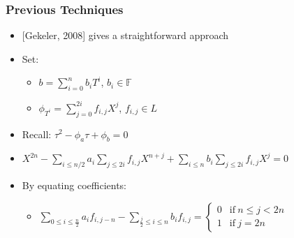 \documentclass{beamer}
\begin{document}
\begin{frame}
\frametitle{Previous Techniques}

\begin{itemize}
    \item $[$Gekeler, 2008] gives a straightforward approach
    \item Set:
    \begin{itemize}
        \item $b = \sum_{i=0}^n b_i T^i$, $b_i \in \mathbb{F}$
        \item $\phi_{T^i} = \sum_{j=0}^{2i}f_{i,j} X^j$, $f_{i,j} \in L$
    \end{itemize}
    \item Recall: $\tau^2 - \phi_a\tau + \phi_b = 0$
    \item $X^{2n} - \sum_{i \leq n/2}a_i\sum_{j\leq 2i}f_{i,j} X^{n + j} + \sum_{i\leq n}b_i \sum_{j \leq 2i}f_{i,j} X^j = 0 $
        \item By equating coefficients:
    \begin{itemize}
    \item 
    $\sum_{0 \leq i \leq \frac{n}{2}} a_i f_{i,j-n} - \sum_{\frac{j}{2} \leq i \leq n} b_if_{i,j} =  \begin{cases} 0 & \text{if}\ n \leq j < 2n \\ 1 & \text{if}\ j = 2n   \end{cases}$
    \end{itemize}
\end{itemize}


\end{frame}





\end{document}
